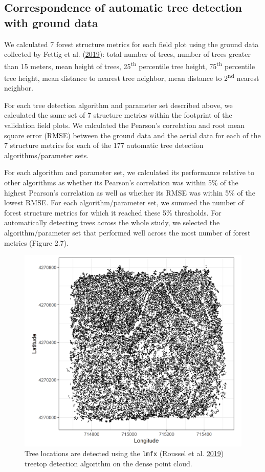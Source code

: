 \documentclass[twoside,12pt,final]{ucthesis-CA2012}
\begin{document}
\begin{ucmainmatter}
\subsection{Correspondence of automatic tree detection with ground
data}\label{correspondence-of-automatic-tree-detection-with-ground-data}

We calculated 7 forest structure metrics for each field plot using the
ground data collected by Fettig et al.
(\protect\hyperlink{ref-fettig2019}{2019}): total number of trees,
number of trees greater than 15 meters, mean height of trees,
25\textsuperscript{th} percentile tree height, 75\textsuperscript{th}
percentile tree height, mean distance to nearest tree neighbor, mean
distance to 2\textsuperscript{nd} nearest neighbor.

For each tree detection algorithm and parameter set described above, we
calculated the same set of 7 structure metrics within the footprint of
the validation field plots. We calculated the Pearson's correlation and
root mean square error (RMSE) between the ground data and the aerial
data for each of the 7 structure metrics for each of the 177 automatic
tree detection algorithms/parameter sets.

For each algorithm and parameter set, we calculated its performance
relative to other algorithms as whether its Pearson's correlation was
within 5\% of the highest Pearson's correlation as well as whether its
RMSE was within 5\% of the lowest RMSE. For each algorithm/parameter
set, we summed the number of forest structure metrics for which it
reached these 5\% thresholds. For automatically detecting trees across
the whole study, we selected the algorithm/parameter set that performed
well across the most number of forest metrics (Figure 2.7).
\begin{figure}
\centering
\includegraphics[width=6.00000in]{figure/chap02/eldo_3k_3_ttops.png}
\caption{Tree locations are detected using the \texttt{lmfx} (Roussel et
al. \protect\hyperlink{ref-roussel2019}{2019}) treetop detection
algorithm on the dense point cloud.}
\end{figure}

\end{ucmainmatter}
\end{document}
